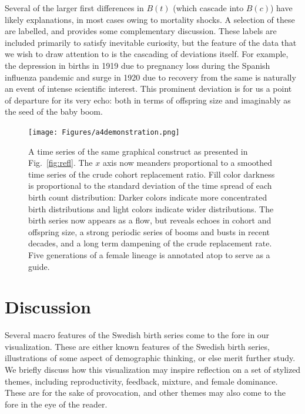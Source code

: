 \documentclass{article}
\begin{document}
Several of the larger first differences in $B(t)$ (which cascade into $B(c)$) have likely explanations, in most cases owing to mortality shocks. A selection of these are labelled, and \cite{utterstrom1954some} provides some complementary discussion. These labels are included primarily to satisfy inevitable curiosity, but the feature of the data that we wish to draw attention to is the cascading of deviations itself. For example, the depression in births in 1919 due to pregnancy loss during the Spanish influenza pandemic and surge in 1920 due to recovery from the same \citep{BobergFazlic2017} is naturally an event of intense scientific interest. This prominent deviation is for us a point of departure for its very echo: both in terms of offspring size and imaginably as the seed of the baby boom. 

\begin{figure}
\texttt{[image: Figures/a4demonstration.png]}
\caption{A time series of the same graphical construct as presented in Fig.~\ref{fig:refl}. The $x$ axis now meanders proportional to a smoothed time series of the crude cohort replacement ratio. Fill color darkness is proportional to the standard deviation of the time spread of each birth count distribution: Darker colors indicate more concentrated birth distributions and light colors indicate wider distributions. The birth series now appears as a flow, but reveals echoes in cohort and offspring size, a strong periodic series of booms and busts in recent decades, and a long term dampening of the crude replacement rate. Five generations of a female lineage is annotated atop to serve as a guide.}
\label{fig:foldout}
\end{figure}

\section{Discussion}
\label{sec:disc}
Several macro features of the Swedish birth series come to the fore in our visualization. These are either known features of the Swedish birth series, illustrations of some aspect of demographic thinking, or else merit further study. We briefly discuss how this visualization may inspire reflection on a set of stylized themes, including reproductivity, feedback, mixture, and female dominance. These are for the sake of provocation, and other themes may also come to the fore in the eye of the reader. 
\end{document}
